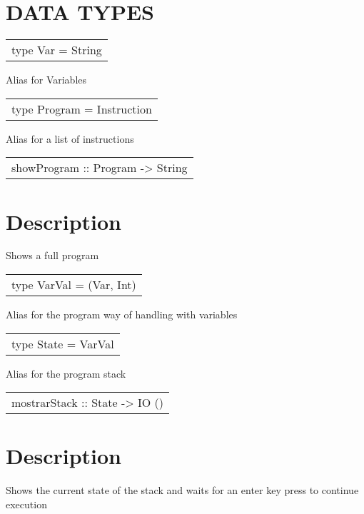 \section{DATA TYPES}
\begin{haddockdesc}
\item[\begin{tabular}{@{}l}
type Var = String
\end{tabular}]
{\haddockbegindoc
Alias for Variables\par}
\end{haddockdesc}
\begin{haddockdesc}
\item[\begin{tabular}{@{}l}
type Program = {\char 91}Instruction{\char 93}
\end{tabular}]
{\haddockbegindoc
Alias for a list of instructions\par}
\end{haddockdesc}
\begin{haddockdesc}
\item[\begin{tabular}{@{}l}
showProgram :: Program -> String
\end{tabular}]
{\haddockbegindoc
\section*{Description}
Shows a full program\par}
\end{haddockdesc}
\begin{haddockdesc}
\item[\begin{tabular}{@{}l}
type VarVal = (Var, Int)
\end{tabular}]
{\haddockbegindoc
Alias for the program way of handling with variables\par}
\end{haddockdesc}
\begin{haddockdesc}
\item[\begin{tabular}{@{}l}
type State = {\char 91}VarVal{\char 93}
\end{tabular}]
{\haddockbegindoc
Alias for the program stack\par}
\end{haddockdesc}
\begin{haddockdesc}
\item[\begin{tabular}{@{}l}
mostrarStack :: State -> IO ()
\end{tabular}]
{\haddockbegindoc
\section*{Description}
Shows the current state of the stack and waits for an enter key press to continue execution\par}
\end{haddockdesc}
